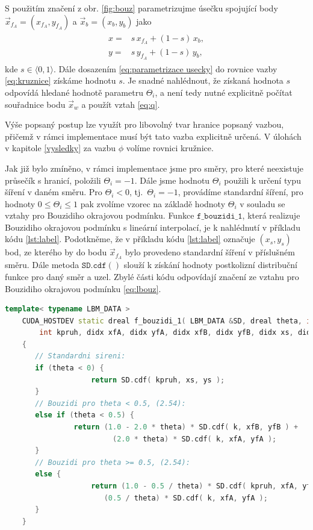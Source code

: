 S použitím značení z obr. \ref{fig:bouz} parametrizujme úsečku spojující body $ \vec{x}_{f{_A}} = (x_{f{_A}}, y_{f{_A}})$ a $ \vec{x}_b  = (x_b, y_b)$ jako
\begin{align}\label{eq:parametrizace usecky}
\begin{split}
x=& s \, x_{f{_A}} + (1 - s) \, x_b,
\\
y=& s \, y_{f{_A}} + (1 - s) \, y_b ,
\end{split}
\end{align}
kde $ s \in \langle 0, 1 \rangle $. Dále dosazením \eqref{eq:parametrizace usecky} do rovnice vazby \eqref{eq:kruznice} získáme hodnotu $ s $. Je snadné nahlédnout, že získaná hodnota $ s $ odpovídá hledané hodnotě parametru $ \Theta_i $, a není tedy nutné explicitně počítat souřadnice bodu  $ \vec{x}_w $ a použít vztah \eqref{eq:q}. 

Výše popsaný postup lze využít pro libovolný tvar hranice popsaný vazbou, přičemž v rámci implementace musí být tato vazba explicitně určená. V úlohách v kapitole \ref{vysledky} za vazbu $ \phi $ volíme rovnici kružnice.

Jak již bylo zmíněno, v rámci implementace jsme pro směry, pro které neexistuje průsečík s hranicí, položili $ \Theta_i = -1$. Dále jsme hodnotu $ \Theta_i$ použili k určení typu šíření v daném směru. Pro $ \Theta_i < 0$, tj.~$ \Theta_i = -1$, provádíme standardní šíření, pro hodnoty $ 0 \leq \Theta_i \leq 1 $ pak zvolíme vzorec na základě hodnoty $ \Theta_i $ v souladu se vztahy pro Bouzidiho okrajovou podmínku. Funkce $\mathtt{f\_bouzidi\_1} $, která realizuje Bouzidiho okrajovou podmínku s lineární interpolací, je k nahlédnutí v příkladu kódu \ref{lst:label}. Podotkněme, že v příkladu kódu \ref{lst:label} označuje $ (x_s, y_s) $ bod, ze kterého by do bodu $ \vec{x}_{f{_A}} $ bylo provedeno standardní šíření v příslušném směru. Dále metoda $\mathtt{SD.cdf()} $ slouží k získání hodnoty postkolizní distribuční funkce pro daný směr a uzel. Zbylé části kódu odpovídají značení ze vztahu pro Bouzidiho okrajovou podmínku \eqref{eq:lbouz}.
%
\vspace{3mm}
\begin{lstlisting}[caption={Funkce realizující Bouzidiho okrajovou podmínku s lineární interpolací.},label={lst:label},language=C++]
	template< typename LBM_DATA >
	CUDA_HOSTDEV static dreal f_bouzidi_1( LBM_DATA &SD, dreal theta, int k,
		int kpruh, didx xfA, didx yfA, didx xfB, didx yfB, didx xs, didx ys )
	{
 	   // Standardni sireni:
 	   if (theta < 0) {
 					return SD.cdf( kpruh, xs, ys );
	   }
	   // Bouzidi pro theta < 0.5, (2.54):
	   else if (theta < 0.5) {
   				return (1.0 - 2.0 * theta) * SD.cdf( k, xfB, yfB ) + 
   				    	 (2.0 * theta) * SD.cdf( k, xfA, yfA );
	   }
	   // Bouzidi pro theta >= 0.5, (2.54):
	   else {
					return (1.0 - 0.5 / theta) * SD.cdf( kpruh, xfA, yfA ) +
	      		 	   (0.5 / theta) * SD.cdf( k, xfA, yfA );
	   }
	}
\end{lstlisting}